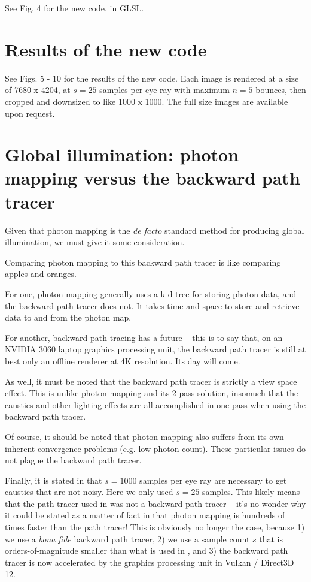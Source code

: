 \documentclass[12pt]{article}
\begin{document}
See Fig. 4 for the new code, in GLSL.








\section{Results of the new code}

See Figs. 5 - 10 for the results of the new code.
Each image is rendered at a size of 7680 x 4204, at $s = 25$ samples per eye ray with maximum $n = 5$ bounces, then cropped and downsized to like 1000 x 1000.
The full size images are available upon request.








\section{Global illumination: photon mapping versus the backward path tracer}

Given that photon mapping \cite{jensen, john} is the \textit{de facto}	standard method for producing global illumination, we must give it some consideration.

Comparing photon mapping to this backward path tracer is like comparing apples and oranges.

For one, photon mapping generally uses a k-d tree for storing photon data, and the backward path tracer does not.
It takes time and space to store and retrieve data to and from the photon map.

For another, backward path tracing has a future -- this is to say that, on an NVIDIA 3060 laptop graphics processing unit, the backward path tracer is still at best only an offline renderer at 4K resolution.
Its day will come.

As well, it must be noted that the backward path tracer is strictly a view space effect.
This is unlike photon mapping and its 2-pass solution, insomuch that the caustics and other lighting effects are all accomplished in one pass when using the backward path tracer.

Of course, it should be noted that photon mapping also suffers from its own inherent convergence problems (e.g. low photon count).
These particular issues do not plague the backward path tracer.

Finally, it is stated in \cite{jensen} that $s = 1000$ samples per eye ray are necessary to get caustics that are not noisy.
Here we only used $s = 25$ samples.
This likely means that the path tracer used in \cite{jensen} was not a backward path tracer -- it's no wonder why it could be stated as a matter of fact in \cite{jensen} that photon mapping is hundreds of times faster than the path tracer!
This is obviously no longer the case, because 1) we use a {\textit{bona fide}} backward path tracer, 2) we use a sample count $s$ that is orders-of-magnitude smaller than what is used in \cite{jensen}, and 3) the backward path tracer is now accelerated by the graphics processing unit in Vulkan / Direct3D 12.
\end{document}
